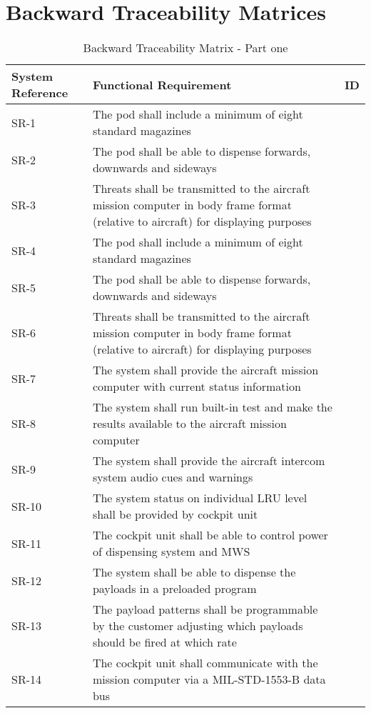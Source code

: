 \documentclass[Main]{subfiles}
\begin{document}
\section{Backward Traceability Matrices}


\begin{table}[htbp]
	\centering
	\begin{tabular}{p{2cm} p{11cm} l} \hline
	System Reference & Functional Requirement & ID\\\hline
	SR-1 & The pod shall include a minimum of eight standard magazines &  \\
	SR-2 & The pod shall be able to dispense forwards, downwards and sideways &  \\
	SR-3 & Threats shall be transmitted to the aircraft mission computer in body frame format (relative to aircraft) for displaying purposes &  \\
	SR-4 & The pod shall include a minimum of eight standard magazines &  \\
	SR-5 & The pod shall be able to dispense forwards, downwards and sideways &  \\
	SR-6 & Threats shall be transmitted to the aircraft mission computer in body frame format
	(relative to aircraft) for displaying purposes &  \\
	SR-7 & The system shall provide the aircraft mission computer with current status information &  \\
	SR-8 &  The system shall run built-in test and make the results available to the aircraft mission
	computer &  \\
	SR-9 & The system shall provide the aircraft intercom system audio cues and warnings &  \\
	SR-10 &  The system status on individual LRU level shall be provided by cockpit unit & \\
	SR-11 & The cockpit unit shall be able to control power of dispensing system and MWS &  \\
	SR-12 & The system shall be able to dispense the payloads in a preloaded program &  \\
	SR-13 & The payload patterns shall be programmable by the customer adjusting which payloads
	should be fired at which rate & \\
	SR-14 & The cockpit unit shall communicate with the mission computer via a MIL-STD-1553-B
	data bus &  \\\hline
	\end{tabular}
\caption{Backward Traceability Matrix - Part one}
\label{Tab:BackwardPartOne}
\end{table}
\end{document}
